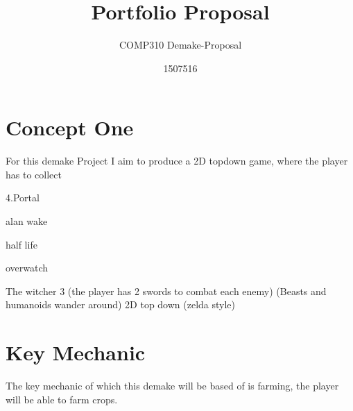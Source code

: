 \documentclass{scrartcl}
\title{Portfolio Proposal}
\subtitle{COMP310 Demake-Proposal}
\author{1507516}
\begin{document}
\maketitle

\abstract{}

\section{Concept One}
For this demake Project I aim to produce a 2D topdown game, where the player has to collect 

4.Portal

alan wake

half life

overwatch

The witcher 3
(the player has 2 swords to combat each enemy)
(Beasts and humanoids wander around)
2D top down (zelda style)


\section{Key Mechanic}
The key mechanic of which this demake will be based of is farming, the player will be able to farm crops.
\end{document}
